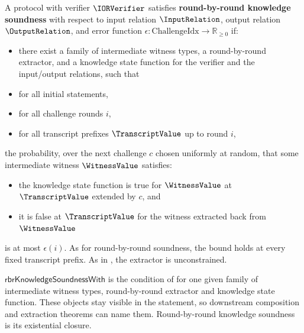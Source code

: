 \begin{definition}
    \label{def:round_by_round_knowledge_soundness}
    A protocol with verifier \(\IORVerifier\) satisfies \textbf{round-by-round knowledge soundness} with respect to input
    relation \(\InputRelation\), output relation \(\OutputRelation\), and error function \(\epsilon: \text{ChallengeIdx} \to \mathbb{R}_{\geq 0}\) if:
    \begin{itemize}
        \item there exist a family of intermediate witness types, a round-by-round extractor, and a
        knowledge state function for the verifier and the input/output relations, such that
        \item for all initial statements,
        \item for all challenge rounds \(i\),
        \item for all transcript prefixes \(\TranscriptValue\) up to round \(i\),
    \end{itemize}
    the probability, over the next challenge \(c\) chosen uniformly at random, that some
    intermediate witness \(\WitnessValue\) satisfies:
    \begin{itemize}
        \item the knowledge state function is true for \(\WitnessValue\) at \(\TranscriptValue\) extended by \(c\), and
        \item it is false at \(\TranscriptValue\) for the witness extracted back from \(\WitnessValue\)
    \end{itemize}
    is at most \(\epsilon(i)\). As for round-by-round soundness, the bound holds at every fixed
    transcript prefix. As in , the extractor is unconstrained.
    \leanok
\end{definition}

\begin{definition}
    \label{def:round_by_round_knowledge_soundness_with}
    \(\mathsf{rbrKnowledgeSoundnessWith}\) is the condition of
     for one given family of intermediate witness
    types, round-by-round extractor and knowledge state function. These objects stay visible in the
    statement, so downstream composition and extraction theorems can name them. Round-by-round
    knowledge soundness is its existential closure.
    \leanok
\end{definition}

